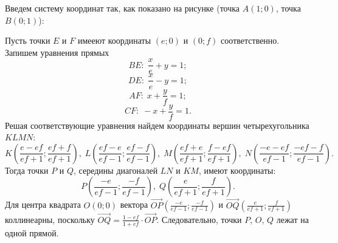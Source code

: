 \solutionSection
Введем систему координат так, как показано на рисунке (точка $A(1;0)$, точка $B(0;1)$): 

Пусть точки $E$  и $F$ имееют координаты $(e;0)$ и $(0;f)$ соответственно. Запишем уравнения прямых
$$BE:\; \dfrac{x}{e}+y=1;$$ 
$$DE:\; \dfrac{x}{e}-y=1;$$ 
$$AF:\;  x+\dfrac{y}{f}=1;$$ 
$$CF:\;  -x+\dfrac{y}{f}=1.$$
Решая соответствующие уравнения найдем координаты вершин четырехугольника $KLMN$: $$K\left(\frac{e-ef}{ef+1};\frac{ef+f}{ef+1}\right),\; L\left(\frac{ef-e}{ef-1};\frac{ef-f}{ef-1}\right),\; M\left(\frac{ef+e}{ef+1};\frac{f-ef}{ef+1}\right),\;N\left(\frac{-e-ef}{ef-1};\frac{-ef-f}{ef-1}\right).$$
Тогда точки $P$ и $Q$, середины диагоналей $LN$ и $KM$,  имеют координаты: $$P\left(\frac{-e}{ef-1};\frac{-f}{ef-1}\right),\; Q\left(\frac{e}{ef+1};\frac{f}{ef+1}\right).$$ 
Для центра квадрата $O(0;0)$ вектора $\overrightarrow{OP}\left(\frac{-e}{ef-1};\frac{-f}{ef-1}\right)$ и $ \overrightarrow{OQ}\left(\frac{e}{ef+1};\frac{f}{ef+1}\right)$ коллинеарны, поскольку $\overrightarrow{OQ}=\frac{1-ef}{1+ef}\cdot\overrightarrow{OP}$. Следовательно, точки $P$, $O$, $Q$ лежат на одной прямой.

